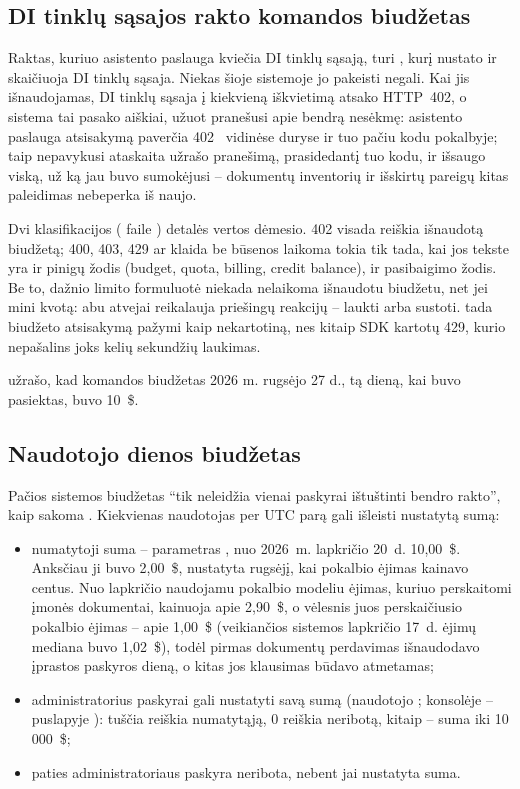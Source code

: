 \subsection{DI tinklų sąsajos rakto komandos biudžetas}

Raktas, kuriuo asistento paslauga kviečia DI tinklų sąsają, turi ,
kurį nustato ir skaičiuoja DI tinklų sąsaja. Niekas šioje sistemoje jo pakeisti negali. Kai jis
išnaudojamas, DI tinklų sąsaja į kiekvieną iškvietimą atsako HTTP~402, o sistema tai pasako
aiškiai, užuot pranešusi apie bendrą nesėkmę: asistento paslauga atsisakymą paverčia
402~ vidinėse duryse ir tuo pačiu kodu pokalbyje; taip nepavykusi
ataskaita užrašo pranešimą, prasidedantį tuo kodu, ir išsaugo viską, už ką jau buvo sumokėjusi
-- dokumentų inventorių ir išskirtų pareigų kitas paleidimas nebeperka iš naujo.

Dvi klasifikacijos ( faile ) detalės
vertos dėmesio. 402 visada reiškia išnaudotą biudžetą; 400, 403, 429 ar klaida be būsenos
laikoma tokia tik tada, kai jos tekste yra ir pinigų žodis (budget, quota, billing, credit
balance), ir pasibaigimo žodis. Be to, dažnio limito formuluotė niekada nelaikoma išnaudotu
biudžetu, net jei mini kvotą: abu atvejai reikalauja priešingų reakcijų -- laukti arba sustoti.
 tada biudžeto atsisakymą pažymi kaip nekartotiną, nes kitaip SDK
kartotų 429, kurio nepašalins joks kelių sekundžių laukimas.

 užrašo, kad komandos biudžetas 2026 m. rugsėjo 27 d., tą dieną,
kai buvo pasiektas, buvo 10~\$.

\subsection{Naudotojo dienos biudžetas}

Pačios sistemos biudžetas \enquote{tik neleidžia vienai paskyrai ištuštinti bendro rakto}, kaip
sakoma . Kiekvienas naudotojas per UTC parą gali išleisti
nustatytą sumą:

\begin{itemize}
  \item numatytoji suma -- parametras , nuo 2026~m. lapkričio 20~d.
    10,00~\$. Anksčiau ji buvo 2,00~\$, nustatyta rugsėjį, kai pokalbio ėjimas kainavo centus.
    Nuo lapkričio naudojamu pokalbio modeliu ėjimas, kuriuo perskaitomi įmonės dokumentai,
    kainuoja apie 2,90~\$, o vėlesnis juos perskaičiusio pokalbio ėjimas -- apie 1,00~\$
    (veikiančios sistemos lapkričio 17~d. ėjimų mediana buvo 1,02~\$), todėl pirmas dokumentų
    perdavimas išnaudodavo įprastos paskyros dieną, o kitas jos klausimas būdavo atmetamas;
  \item administratorius paskyrai gali nustatyti savą sumą (naudotojo ;
    konsolėje -- puslapyje ): tuščia reiškia numatytąją, 0 reiškia neribotą,
    kitaip -- suma iki 10\,000~\$;
  \item paties administratoriaus paskyra neribota, nebent jai nustatyta suma.
\end{itemize}

